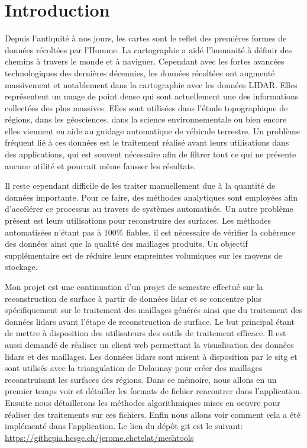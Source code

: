 \chapter*{Introduction}

Depuis l'antiquité à nos jours, les cartes sont le reflet des premières formes de données récoltées par l'Homme.
La cartographie a aidé l'humanité à définir des chemins à travers le monde et à naviguer.
Cependant avec les fortes avancées technologiques des dernières décennies, les données récoltées ont augmenté massivement et notablement dans la cartographie avec les données LIDAR. Elles représentent un nuage de point dense qui sont actuellement une des informations collectées des plus massives.
Elles sont utilisées dans l'étude topographique de régions, dans les géosciences, dans la science environnementale ou bien encore elles viennent en aide au guidage automatique de véhicule terrestre. Un problème fréquent lié à ces données est le traitement réalisé avant leurs utilisations dans des applications, qui est souvent nécessaire afin de filtrer tout ce qui ne présente aucune utilité et pourrait même fausser les résultats.

Il reste cependant difficile de les traiter manuellement due à la quantité de données importante. Pour ce faire, des méthodes analytiques sont employées afin d'accélérer ce processus au travers de systèmes automatisés.
Un autre problème présent est leurs utilisations pour reconstruire des surfaces. Les méthodes automatisées n'étant pas à 100\% fiables, il est nécessaire de vérifier la cohérence des données ainsi que la qualité des maillages produits.
Un objectif supplémentaire est de réduire leurs empreintes volumiques sur les moyens de stockage.

Mon projet est une continuation d'un projet de semestre effectué sur la reconstruction de surface à partir de données lidar et se concentre plus spécifiquement sur le traitement des maillages générés ainsi que du traitement des données lidars avant l'étape de reconstruction de surface.
Le but principal étant de mettre à disposition des utilisateurs des outils de traitement efficace.
Il est aussi demandé de réaliser un client web permettant la visualisation des données lidars et des maillages.
Les données lidars sont misent à disposition par le \gls{sitg} et sont utilisés avec la triangulation de Delaunay pour créer des maillages reconstruisant les surfaces des régions.
Dans ce mémoire, nous allons en un premier temps voir et détailler les formats de fichier rencontrer dans l'application.
Ensuite nous détaillerons les méthodes algorithmiques mises en oeuvre pour réaliser des traitements sur ces fichiers.
Enfin nous allons voir comment cela a été implémenté dans l'application. Le lien du dépôt git est le suivant: \href{https://githepia.hesge.ch/jerome.chetelat/meshtools}{https://githepia.hesge.ch/jerome.chetelat/meshtools}